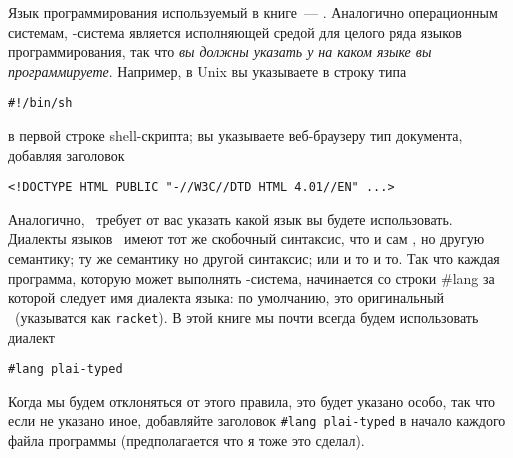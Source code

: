 
Язык программирования используемый в книге\ --- 
\href{http://www.racket-lang.org/}{\racket}. Аналогично операционным системам,
\racket-система является исполняющей средой для целого ряда языков
программирования, так что \emph{вы должны указать \racket у на каком языке 
вы программируете}. Например, в Unix вы указываете в строку типа

\begin{verbatim}
#!/bin/sh
\end{verbatim}

в первой строке shell-скрипта; вы указываете веб-браузеру
тип документа, добавляя заголовок

\begin{verbatim}
<!DOCTYPE HTML PUBLIC "-//W3C//DTD HTML 4.01//EN" ...>
\end{verbatim}

Аналогично, \racket\ требует от вас указать какой язык вы будете использовать.
Диалекты языков \racket\ имеют тот же скобочный синтаксис, что и сам \racket, но
другую семантику; ту же семантику но другой синтаксис; или и то и то.
Так что каждая программа, которую может выполнять \racket-система, начинается со
строки \#lang за которой следует имя диалекта языка: по умолчанию, это
оригинальный \racket\ (указыватся как \verb|racket|). В этой книге мы почти
всегда будем использовать диалект

\begin{verbatim}
#lang plai-typed
\end{verbatim}

Когда мы будем отклоняться от этого правила, это будет указано особо, так что
если не указано иное, добавляйте заголовок \verb|#lang plai-typed| в начало
каждого файла программы (предполагается что я тоже это сделал).

